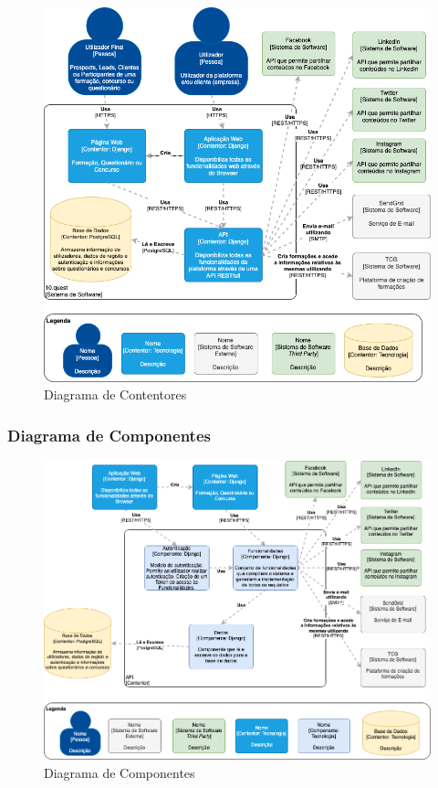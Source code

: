 \begin{figure}[ht!]
	\begin{center}
		\includegraphics[width=1\textwidth]{img/arq/diagrama-contentores}
		\caption{Diagrama de Contentores}
		\label{fig:arq-contentores}
	\end{center}
\end{figure}

\subsubsection{Diagrama de Componentes}

\begin{figure}[ht!]
	\begin{center}
		\includegraphics[width=1\textwidth]{img/arq/diagrama-componentes}
		\caption{Diagrama de Componentes}
		\label{fig:arq-componentes}
	\end{center}
\end{figure}

